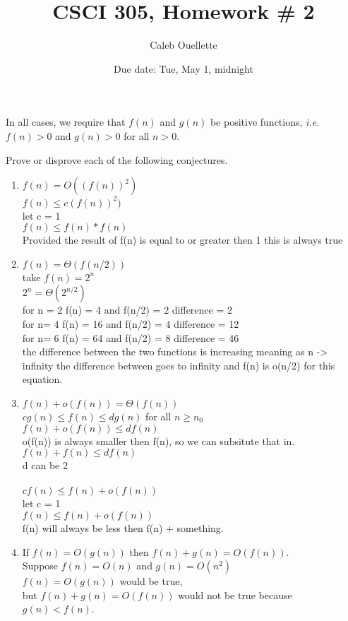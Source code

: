 \documentclass{article}
\title{CSCI 305, Homework \# 2}
\author{Caleb Ouellette}
\date{Due date:  Tue, May 1, midnight}
\begin{document}
  
  \maketitle
  
  In all cases,
  we require that $f(n)$ and $g(n)$ be positive functions,
  {\em i.e.} $f(n) > 0$ and $g(n) > 0$ for all $n > 0$.
  
  Prove or disprove each of the following conjectures.
  
  
  \begin{enumerate}
  \item
    $f(n) = O((f(n))^2)$\\
    $f(n) \leq c(f(n))^2) $\\
    let c = 1 \\
    $f(n) \leq f(n) * f(n)$\\
    
  Provided the result of f(n) is equal to or greater then 1 this is always true
  \item
    $f(n) = \Theta(f(n/2))$ \\
    take $f(n) = 2^n$ \\
    $2^n = \Theta(2^{n/2})$ \\
    for n = 2 f(n) = 4 and f(n/2) = 2 difference = 2\\
    for n= 4 f(n) = 16 and f(n/2) = 4 difference = 12\\
    for n= 6 f(n) = 64 and f(n/2) = 8 difference = 46\\
    the difference between the two functions is increasing meaning as n -> infinity the difference between goes to infinity and f(n) is o(n/2) for this equation.
  \item
    $f(n) + o(f(n)) = \Theta(f(n))$ \\
    $cg(n) \leq f(n) \leq dg(n)$ for all $n \geq n_0$ \\
    $f(n) + o(f(n)) \leq df(n)$  \\
    o(f(n)) is always smaller then f(n), so we can subsitute that in. \\
    $f(n) + f(n) \leq df(n)$  \\
    d can be 2 \\
    \\
    $cf(n) \leq f(n) + o(f(n))$ \\
    let c = 1 \\
    $f(n) \leq f(n) + o(f(n))$ \\
    f(n) will always be less then f(n) + something.

  \item
    If $f(n) = O(g(n))$ then $f(n) + g(n) = O(f(n))$.\\
    Suppose $f(n) = O(n)$ and $g(n) =O(n^2)$\\
    $f(n)= O(g(n))$ would be true,\\
    but $f(n) + g(n) =O(f(n))$ would not be true because $g(n) < f(n)$.
  \end{enumerate}
  
  
\end{document}
